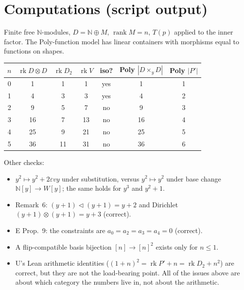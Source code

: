 \documentclass[11pt]{article}
\newcommand{\tri}{\mathbin{\triangleleft}}
\newcommand{\N}{\mathbb{N}}
\begin{document}
\appendix
\section{Computations (script output)}
\small
Finite free $\N$-modules, $D=\N\oplus M$, $\operatorname{rank}M=n$, $T(p)$ applied to the inner
factor. The Poly-function model has linear containers with morphisms equal to functions on shapes.
\begin{center}\begin{tabular}{c|cccc|cc}
$n$ & $\operatorname{rk}D\otimes D$ & $\operatorname{rk}D_2$ & $\operatorname{rk}V$ & iso? & Poly $|D\times_yD|$ & Poly $|P'|$\\\hline
0&1&1&1&yes&1&1\\
1&4&3&3&yes&4&2\\
2&9&5&7&no&9&3\\
3&16&7&13&no&16&4\\
4&25&9&21&no&25&5\\
5&36&11&31&no&36&6
\end{tabular}\end{center}
Other checks:
\begin{itemize}[leftmargin=1.2em]
\item $y^2\mapsto y^2+2\varepsilon vy$ under substitution, versus $y^2\mapsto y^2$ under base
change $\N[y]\to W[y]$; the same holds for $y^3$ and $y^2+1$.
\item Remark~6: $(y+1)\tri(y+1)=y+2$ and Dirichlet $(y+1)\otimes(y+1)=y+3$ (correct).
\item E Prop.~9: the constraints are $a_0=a_2=a_3=a_4=0$ (correct).
\item A flip-compatible basis bijection $[n]\to[n]^2$ exists only for $n\le1$.
\item U's Lean arithmetic identities ($(1+n)^2=\operatorname{rk}P'+n=\operatorname{rk}D_2+n^2$) are
correct, but they are not the load-bearing point. All of the issues above are about which category
the numbers live in, not about the arithmetic.
\end{itemize}
\end{document}
